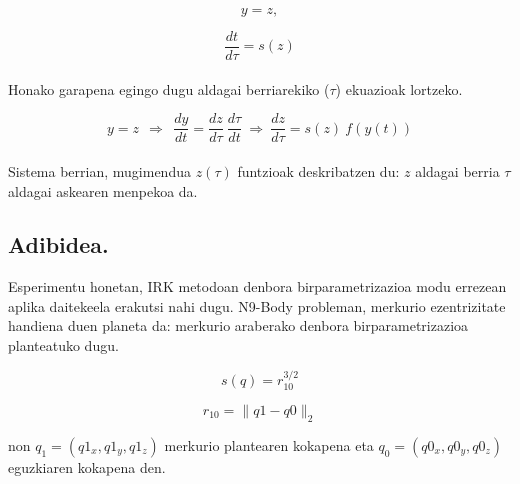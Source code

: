\begin{equation*}
y=z,
\end{equation*}

\begin{equation*}
\frac{dt}{d\tau}=s(z)
\end{equation*}

\paragraph*{} Honako garapena egingo dugu aldagai berriarekiko ($\tau$) ekuazioak lortzeko.

\begin{equation*}
y=z \ \ \Rightarrow \ \ \frac{dy}{dt}=\frac{dz}{d \tau} \ \frac{d \tau}{dt} \ \Rightarrow \ \frac{dz}{d \tau}= s(z) \ f(y(t)) 
\end{equation*}

\paragraph*{} Sistema berrian, mugimendua $z(\tau)$ funtzioak deskribatzen du: $z$ aldagai berria $\tau$ aldagai askearen menpekoa da. 

\subsection{Adibidea.}

Esperimentu honetan, IRK metodoan denbora birparametrizazioa modu errezean aplika daitekeela erakutsi nahi dugu. N9-Body probleman, merkurio ezentrizitate handiena duen planeta da: merkurio araberako denbora birparametrizazioa planteatuko dugu.

\begin{equation}
s(q)=r_{10}^{3/2}
\end{equation}

\begin{equation}
r_{10}=\|q1-q0\|_2
\end{equation}

non $q_1=(q1_{x},q1_{y},q1_{z})$ merkurio plantearen kokapena eta $q_0=(q0_{x},q0_{y},q0_{z})$ eguzkiaren kokapena den.